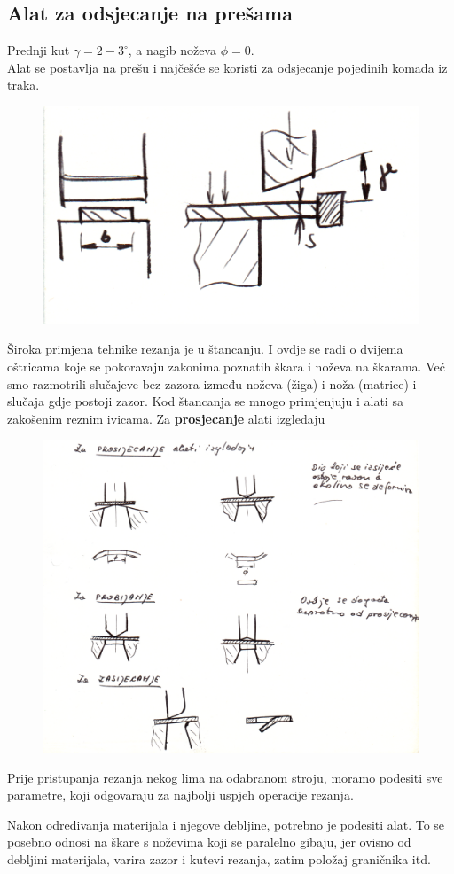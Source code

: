 \documentclass[a4paper,12pt]{article}
\numberwithin{figure}{section}
\begin{document}
\subsection{Alat za odsjecanje na prešama}
Prednji kut $\gamma = 2 - 3^{\circ}$, a nagib noževa $\phi = 0$. \\ Alat se postavlja na prešu i najčešće se koristi za odsjecanje pojedinih komada iz traka.\par
\begin{figure}[!h]
\centering
\includegraphics[scale=0.2]{image_56-1.png}
\end{figure}
\FloatBarrier
Široka primjena tehnike rezanja je u štancanju. I ovdje se radi o dvijema oštricama koje se pokoravaju zakonima poznatih škara i noževa na škarama. Već smo razmotrili slučajeve bez zazora između noževa (žiga) i noža (matrice) i slučaja gdje postoji zazor. Kod štancanja se mnogo primjenjuju i alati sa zakošenim reznim ivicama. Za \textbf{prosjecanje} alati izgledaju 
\begin{figure}[!h]
\centering
\includegraphics[scale=0.17]{image_56-2.png}
\end{figure}
\FloatBarrier
Prije pristupanja rezanja nekog lima na odabranom stroju, moramo podesiti sve parametre, koji odgovaraju za najbolji uspjeh operacije rezanja. \par
Nakon određivanja materijala i njegove debljine, potrebno je podesiti alat. To se posebno odnosi na škare s noževima koji se paralelno gibaju, jer ovisno od debljini materijala, varira zazor i kutevi rezanja, zatim položaj graničnika itd.
\end{document}

